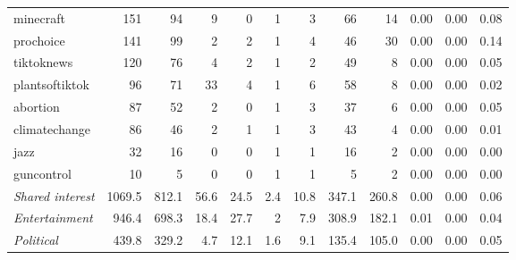\begin{tabular}{lrrrrrrrrrrr}
       minecraft &    151 &     94 &                           9 &                            0 &    1 &      3 &            66 &                         14 &   0.00 &         0.00 &                                0.08 \\
       prochoice &    141 &     99 &                           2 &                            2 &    1 &      4 &            46 &                         30 &   0.00 &         0.00 &                                0.14 \\
      tiktoknews &    120 &     76 &                           4 &                            2 &    1 &      2 &            49 &                          8 &   0.00 &         0.00 &                                0.05 \\
  plantsoftiktok &     96 &     71 &                          33 &                            4 &    1 &      6 &            58 &                          8 &   0.00 &         0.00 &                                0.02 \\
        abortion &     87 &     52 &                           2 &                            0 &    1 &      3 &            37 &                          6 &   0.00 &         0.00 &                                0.05 \\
   climatechange &     86 &     46 &                           2 &                            1 &    1 &      3 &            43 &                          4 &   0.00 &         0.00 &                                0.01 \\
            jazz &     32 &     16 &                           0 &                            0 &    1 &      1 &            16 &                          2 &   0.00 &         0.00 &                                0.00 \\
      guncontrol &     10 &      5 &                           0 &                            0 &    1 &      1 &             5 &                          2 &   0.00 &         0.00 &                                0.00 \\
      \midrule
\textit{Shared interest} & 1069.5 & 812.1 &                       56.6 &                        24.5 & 2.4 &  10.8 &        347.1 &                     260.8 &   0.00 &         0.00 &                                0.06 \\
  \textit{Entertainment} &  946.4 & 698.3 &                       18.4 &                        27.7 & 2 &   7.9 &        308.9 &                     182.1 &   0.01 &         0.00 &                                0.04 \\
      \textit{Political} &  439.8 & 329.2 &                        4.7 &                        12.1 & 1.6 &   9.1 &        135.4 &                     105.0 &   0.00 &         0.00 &                                0.05 \\
\bottomrule
\end{tabular}

